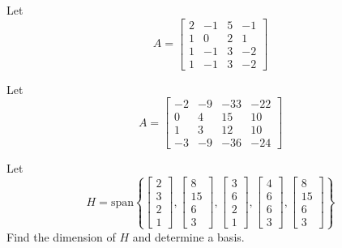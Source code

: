 \documentclass{ximera}
\begin{document}
\begin{problem}\label{prb:5.1} Let 
    $$A = 
\begin{bmatrix}
2 & -1 & 5 & -1\\
1 & 0 &2 & 1 \\
1 & -1 & 3 & -2\\
1 & -1 & 3 & -2
\end{bmatrix}$$ 
\end{problem}

\begin{problem}\label{prb:5.3} Let $$A=
\begin{bmatrix}
-2 & -9 & -33 & -22\\
0 & 4 & 15 & 10\\
1 & 3 & 12 & 10\\
-3 & -9 &-36 & -24
\end{bmatrix}$$ 
\end{problem}

\begin{problem}\label{prb:5.5} Let $$H=\mbox{span}\left\{ \left[
    \begin{array}{r}
    2 \\
    3 \\
    2 \\
    1
    \end{array}
    \right] ,\left[
    \begin{array}{r}
    8 \\
    15 \\
    6 \\
    3
    \end{array}
    \right] ,\left[
    \begin{array}{r}
    3 \\
    6 \\
    2 \\
    1
    \end{array}
    \right] ,\left[
    \begin{array}{r}
    4 \\
    6 \\
    6 \\
    3
    \end{array}
    \right] ,\left[
    \begin{array}{r}
    8 \\
    15 \\
    6 \\
    3
    \end{array}
    \right] \right\} $$ 
    Find the dimension of $H$ and determine a basis.
    
    \end{problem}
\end{document}
